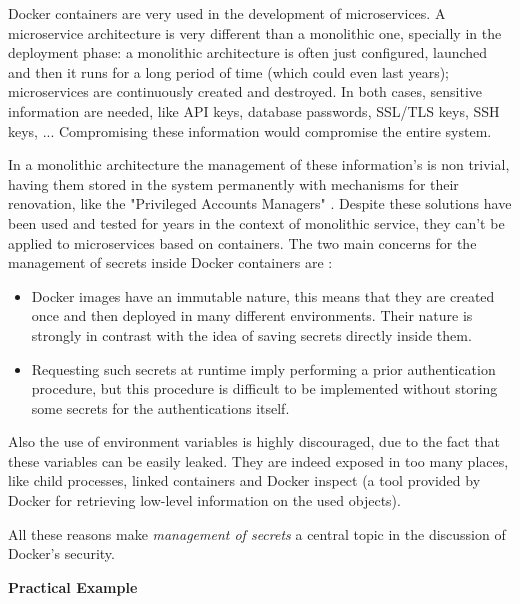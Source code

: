 \documentclass[a4paper,12pt]{article}
\begin{document}
Docker containers are very used in the development of microservices. A
microservice architecture is very different than a monolithic one, specially in
the deployment phase: a monolithic architecture is often just configured,
launched and then it runs for a long period of time (which could even last
years); microservices are continuously created and destroyed. In both cases,
sensitive information are needed, like API keys, database passwords, SSL/TLS
keys, SSH keys, ... Compromising these information would compromise the
entire system. \par In a monolithic architecture the management of these
information's is non trivial, having them stored in the system permanently with
mechanisms for their renovation, like the "Privileged Accounts
Managers" \cite{privileged_accounts_managers}. Despite these solutions have been
used and tested for years in the context of monolithic service, they can't be
applied to microservices based on containers. The two main concerns for the
management of secrets inside Docker containers
are \cite{secret_management_concerns_docker}:
\begin{itemize}
  \item Docker images have an immutable nature, this means that they are created
  once and then deployed in many different environments. Their nature is
  strongly in contrast with the idea of saving secrets directly inside them.  
  \item Requesting such secrets at runtime imply performing a prior
  authentication procedure, but this procedure is difficult to be implemented
  without storing some secrets for the authentications itself.
\end{itemize}
\par Also the use of environment variables is highly discouraged, due to the
fact that these variables can be easily leaked. They are indeed exposed in too
many places, like child processes, linked containers and Docker inspect (a tool
provided by Docker for retrieving low-level information on the used
objects).\par All these reasons make \textit{management of secrets} a central
topic in the discussion of Docker's security. 

\bigbreak\textbf{Practical Example}\bigbreak 
\end{document}

